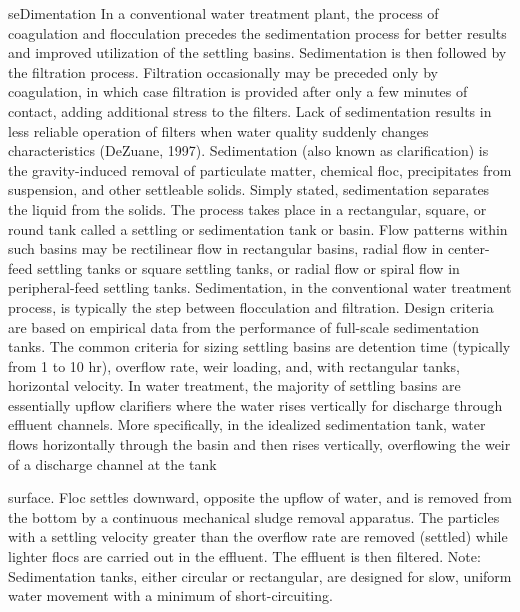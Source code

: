 \documentclass{article}
\begin{document}
seDimentation In a conventional water treatment plant, the process of
coagulation and flocculation precedes the sedimentation process for
better results and improved utilization of the settling basins.
Sedimentation is then followed by the filtration process. Filtration
occasionally may be preceded only by coagulation, in which case
filtration is provided after only a few minutes of contact, adding
additional stress to the filters. Lack of sedimentation results in less
reliable operation of filters when water quality suddenly changes
characteristics (DeZuane, 1997). Sedimentation (also known as
clarification) is the gravity-induced removal of particulate matter,
chemical floc, precipitates from suspension, and other settleable
solids. Simply stated, sedimentation separates the liquid from the
solids. The process takes place in a rectangular, square, or round tank
called a settling or sedimentation tank or basin. Flow patterns within
such basins may be rectilinear flow in rectangular basins, radial flow
in center-feed settling tanks or square settling tanks, or radial flow
or spiral flow in peripheral-feed settling tanks. Sedimentation, in the
conventional water treatment process, is typically the step between
flocculation and filtration. Design criteria are based on empirical data
from the performance of full-scale sedimentation tanks. The common
criteria for sizing settling basins are detention time (typically from 1
to 10 hr), overflow rate, weir loading, and, with rectangular tanks,
horizontal velocity. In water treatment, the majority of settling basins
are essentially upflow clarifiers where the water rises vertically for
discharge through effluent channels. More specifically, in the idealized
sedimentation tank, water flows horizontally through the basin and then
rises vertically, overflowing the weir of a discharge channel at the
tank

surface. Floc settles downward, opposite the upflow of water, and is
removed from the bottom by a continuous mechanical sludge removal
apparatus. The particles with a settling velocity greater than the
overflow rate are removed (settled) while lighter flocs are carried out
in the effluent. The effluent is then filtered. Note: Sedimentation
tanks, either circular or rectangular, are designed for slow, uniform
water movement with a minimum of short-circuiting.
\end{document}
